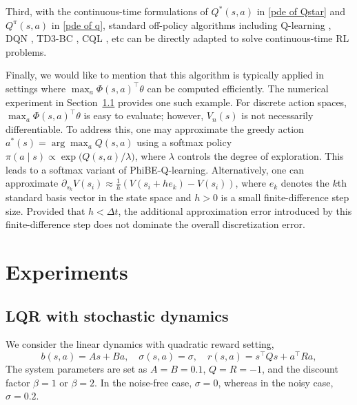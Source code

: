 \documentclass[12pt]{article}
\def\th{\theta}
\def\th{\theta}
\def\pt{\partial}
\begin{document}
Third, with the continuous-time formulations of $Q^*(s,a)$ in \eqref{pde of Qstar} and $Q^\pi(s,a)$ in \eqref{pde of q}, standard off-policy algorithms including Q-learning \citep{watkins1992q}, DQN \citep{mnih2015human}, TD3-BC \citep{fujimoto2021minimalist}, CQL \citep{kumar2020conservative}, etc can be directly adapted to solve continuous-time RL problems.





Finally, we would like to mention that this algorithm is typically applied in settings where $\max_a \Phi(s,a)^\top \theta$ can be computed efficiently. The numerical experiment in Section~\ref{sec:lqr} provides one such example. For discrete action spaces, $\max_a \Phi(s,a)^\top \theta$ is easy to evaluate; however, $V_n(s)$ is not necessarily differentiable. To address this, one may approximate the greedy action $a^*(s) = \arg\max_a Q(s,a)$ using a softmax policy $\pi(a \mid s) \propto \exp\!\big(Q(s,a)/\lambda\big)$, where $\lambda$ controls the degree of exploration. This leads to a softmax variant of PhiBE-Q-learning. Alternatively, one can approximate $\pt_{s_k}V(s_i) \approx \frac1h(V(s_i + he_k) - V(s_i))$, where $e_k$ denotes the $k$th standard basis vector in the state space and $h>0$ is a small finite-difference step size. Provided that $h<\Delta t$, the additional approximation error introduced by this finite-difference step does not dominate the overall discretization error.


\section{Experiments} \label{sec:4.3}
\subsection{LQR with stochastic dynamics}\label{sec:lqr}
We consider the linear dynamics with quadratic reward setting,
\[
b(s,a) = As + Ba, \quad\sigma(s,a) = \sigma, \quad r(s,a) = s^\top Q s+a^\top Ra,
\]
The system parameters are set as $A = B = 0.1$, $Q = R = -1$, and the discount factor $\beta = 1$ or $\beta = 2$. In the noise-free case, $\sigma = 0$, whereas in the noisy case, $\sigma = 0.2$. 
\end{document}
